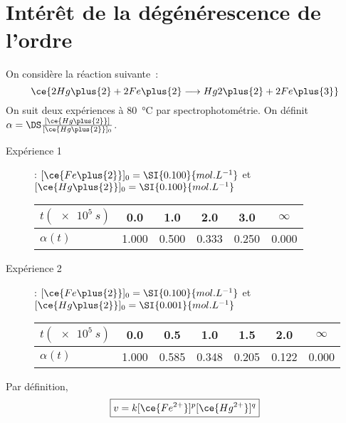 \documentclass[a4paper, 11pt]{book}
\begin{document}
\resetQ
\section{Intérêt de la dégénérescence de l'ordre}
On considère la réaction suivante~:
\[\ce{2Hg\plus{2} + 2Fe\plus{2} \longrightarrow Hg2\plus{2} + 2Fe\plus{3}}\]
On suit deux expériences à \SI{80}{\degreeCelsius} par spectrophotométrie. On
définit $\alpha = \DS \frac{[\ce{Hg\plus{2}}]}{[\ce{Hg\plus{2}}]_0}$.
\begin{description}
    \item[Expérience 1] : $[\ce{Fe\plus{2}}]_0 = \SI{0.100}{mol.L^{-1}}$ et
        $[\ce{Hg\plus{2}}]_0 = \SI{0.100}{mol.L^{-1}}$
        \begin{center}
            \begin{tabular}{lccccc}
                \toprule 
                $t (\SI{e5}{s})$ &
                \num{0.0} & \num{1.0} & \num{2.0} & \num{3.0} & $\infty$\\
                \midrule
                $\alpha(t)$ &
                \num{1.000} & \num{0.500} & \num{0.333} & \num{0.250} &
                \num{0.000}\\
                \bottomrule
            \end{tabular}
        \end{center}
    \item[Expérience 2] : $[\ce{Fe\plus{2}}]_0 = \SI{0.100}{mol.L^{-1}}$ et
        $[\ce{Hg\plus{2}}]_0 = \SI{0.001}{mol.L^{-1}}$
        \begin{center}
            \begin{tabular}{lcccccc}
                \toprule 
                $t (\SI{e5}{s})$ &
                \num{0.0} & \num{0.5} & \num{1.0} & \num{1.5} & \num{2.0} &
                $\infty$\\
                \midrule
                $\alpha(t)$ &
                \num{1.000} & \num{0.585} & \num{0.348} & \num{0.205} &
                \num{0.122} & \num{0.000}\\
                \bottomrule
            \end{tabular}
        \end{center}
\end{description}

{
    Par définition,
    \[\boxed{v = k[\ce{Fe^{2+}}]^p[\ce{Hg^{2+}}]^q}\]
}
\end{document}
